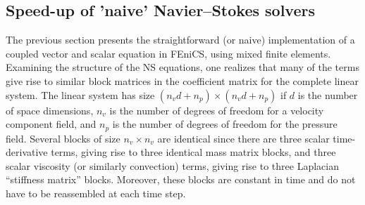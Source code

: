\subsection{Speed-up of 'naive' Navier--Stokes solvers}
\label{sec:mortensen:speed-up}

The previous section presents the straightforward (or naive)
implementation of a coupled vector and scalar equation in FEniCS, using
mixed finite elements.  Examining the structure of the NS equations, one
realizes that many of the terms give rise to similar block matrices in
the coefficient matrix for the complete linear system. The linear system
has size $(n_vd + n_p) \times (n_vd + n_p)$ if $d$ is the number of space
dimensions, $n_v$ is the number of degrees of freedom for a velocity
component field, and $n_p$ is the number of degrees of freedom for the
pressure field.  Several blocks of size $n_v\times n_v$ are identical
since there are three scalar time-derivative terms, giving rise to three
identical mass matrix blocks, and three scalar viscosity (or similarly
convection) terms, giving rise to three Laplacian ``stiffness matrix''
blocks.  Moreover, these blocks are constant in time and do not have to
be reassembled at each time step.

